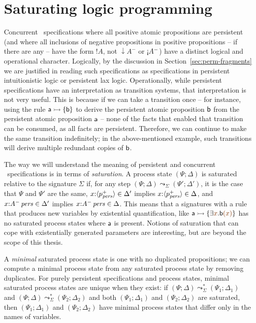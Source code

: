 \section{Saturating logic programming}

Concurrent \sls~specifications where all positive atomic propositions
are persistent (and where all inclusions of negative propositions in
positive propositions -- if there are any -- have the form ${!}A$, not
${\downarrow}A^-$ or ${\gnab}A^-$) have a distinct logical and
operational character. Logically, by the discussion in
Section~\ref{sec:perm-fragments} we are justified in reading such
specifications as specifications in persistent intuitionistic logic or
persistent lax logic. Operationally, while persistent specifications
have an interpretation as transition systems, that interpretation is
not very useful. This is because if we can take a transition once --
for instance, using the rule ${\sf a} \rightarrowtail \{ {\sf b} \}$ to derive
the persistent atomic proposition ${\sf b}$ from the persistent atomic
proposition ${\sf a}$ -- none of the facts that enabled that
transition can be consumed, as all facts are persistent. Therefore, we
can continue to make the same transition indefinitely; in the
above-mentioned example, such transitions will derive multiple
redundant copies of ${\sf b}$.

The way we will understand the meaning of persistent and concurrent
\sls~specifications is in terms of {\it saturation}. A process state
$(\Psi; \Delta)$ is saturated relative to the signature $\Sigma$ if,
for any step $(\Psi; \Delta) \leadsto_\Sigma (\Psi'; \Delta')$, it is
the case that $\Psi$ and $\Psi'$ are the same, $x{:}\langle {p^+_{\it pers}} \rangle
\in \Delta'$ implies $x{:}\langle {p^+_{\it pers}} \rangle \in \Delta$, and
$x{:}{A^-}\,{{\it pers}} \in \Delta'$ implies $x{:}{A^-}\,{{\it pers}} \in
\Delta$. This means that a signatures with a rule that produces new
variables by existential quantification, like ${\sf a} \lefti \{
\exists \lf{x}. {\sf b}\lf{(x)} \}$ has no saturated process states
where ${\sf a}$ is present. Notions of saturation that can cope with
existentially generated parameters are interesting, but are beyond the
scope of this thesis.

A {\it minimal} saturated process state is one with no duplicated
propositions; we can compute a minimal process state from any
saturated process state by removing duplicates. For purely persistent
specifications and process states, minimal saturated process states
are unique when they exist: if $(\Psi; \Delta) \leadsto^*_\Sigma
(\Psi_1; \Delta_1)$ and $(\Psi; \Delta) \leadsto^*_\Sigma (\Psi_2;
\Delta_2)$ and both $(\Psi_1; \Delta_1)$ and $(\Psi_2; \Delta_2)$ are
saturated, then $(\Psi_1; \Delta_1)$ and $(\Psi_2; \Delta_2)$ have
minimal process states that differ only in the names of variables.

